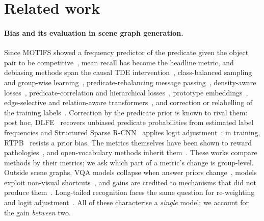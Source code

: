 \section{Related work}\label{sec:related}

\paragraph{Bias and its evaluation in scene graph generation.}\label{sec:related-applied}
Since MOTIFS showed a frequency predictor of the predicate given the object pair to be
competitive~\cite{xu2017scene,zellers2018neural}, mean recall has become the headline metric,
and debiasing methods span the causal TDE intervention~\cite{tang2020unbiased,tang2020long}, class-balanced sampling
and group-wise learning~\cite{desai2021learning,dong2022stacked}, predicate-rebalancing message
passing~\cite{li2021bgnn}, density-aware losses~\cite{knyazev2020graph}, predicate-correlation and hierarchical
losses~\cite{yan2020pcpl,yu2021cogtree,lyu2022fine}, prototype embeddings~\cite{zheng2023prototype}, edge-selective and relation-aware transformers~\cite{jung2023devil,sudhakaran2023vision}, and
correction or relabelling of the training labels~\cite{li2022devil,zhang2022finegrained}.
Correction by the predicate prior is known to rival them: post hoc, DLFE~\cite{chiou2021recovering}
recovers unbiased predicate probabilities from estimated label frequencies and Structured
Sparse R-CNN~\cite{teng2022structured} applies logit adjustment~\cite{menon2021long}; in
training, RTPB~\cite{chen2022resistance} resists a prior bias. The
metrics themselves have been shown to reward pathologies~\cite{li2022rethinking}, and
open-vocabulary methods inherit them~\cite{li2024pixels}. These works compare methods by their
metrics; we ask which part of a metric's change is group-level. Outside scene graphs, VQA models collapse when answer
priors change~\cite{agrawal2018dont}, models exploit non-visual
shortcuts~\cite{geirhos2020shortcut,zhou2025shortcut}, and gains are credited to mechanisms
that did not produce them~\cite{shrestha2020negative,teney2020value}. Long-tailed recognition faces the
same question for re-weighting and logit adjustment~\cite{cao2019learning,menon2021long}.
All of these characterise a \emph{single} model; we account for the gain \emph{between} two.

